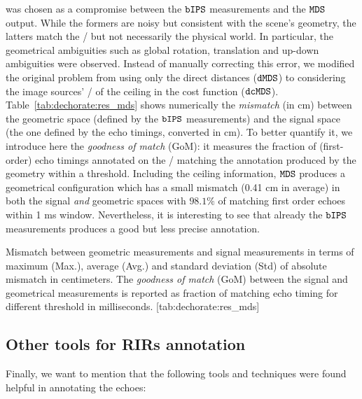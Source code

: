  was chosen as a compromise between the $\mathtt{bIPS}$ measurements and the $\mathtt{MDS}$ output.
While the formers are noisy but consistent with the scene's geometry, the latters match the \TOAs/ but not necessarily the physical world.
In particular, the geometrical ambiguities such as global rotation, translation and up-down ambiguities were observed.
Instead of manually correcting this error, we modified the original problem from using only the direct distances ($\mathtt{dMDS}$) to considering the  image sources' \TOA/ of the ceiling in the cost function ($\mathtt{dcMDS}$).
Table~\ref{tab:dechorate:res_mds} shows numerically the \textit{mismatch} (in cm) between the geometric space (defined by the $\mathtt{bIPS}$ measurements) and the signal space (the one defined by the echo timings, converted in cm).
To better quantify it, we introduce here the \textit{goodness of match} (GoM): it measures the fraction of (first-order) echo timings annotated on the \RIRs/ matching the annotation produced by the geometry within a threshold.
Including the ceiling information, $\mathtt{MDS}$ produces a geometrical configuration which has a small mismatch (0.41 cm in average) in both the signal \textit{and} geometric spaces with $98.1\%$ of matching first order echoes within 1 ms window.
Nevertheless, it is interesting to see that already the $\mathtt{bIPS}$ measurements produces a good but less precise annotation.

\begin{table}[]
    \begin{sidecaption}[]{
        Mismatch between geometric measurements and signal measurements in terms of maximum (Max.), average (Avg.) and standard deviation (Std) of absolute mismatch in centimeters. The \textit{goodness of match} (GoM) between the signal and geometrical measurements is reported as fraction of matching echo timing for different threshold in milliseconds.
        }[tab:dechorate:res_mds]
        \centering
        \small
        
    \end{sidecaption}
\end{table}

\subsection{Other tools for RIRs annotation}
Finally, we want to mention that the following tools and techniques were found helpful in annotating the echoes:

